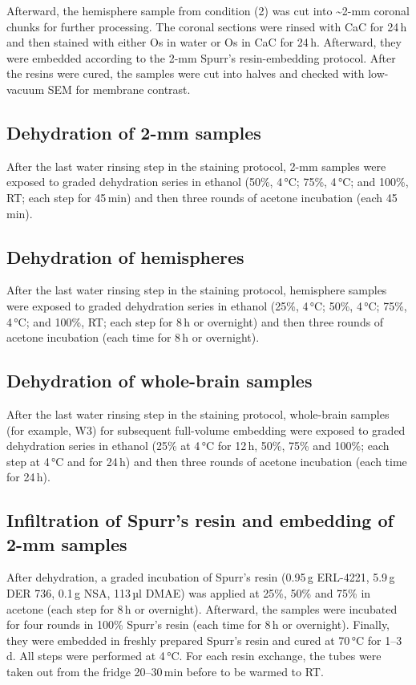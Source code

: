 \documentclass{article}
\begin{document}
Afterward, the hemisphere sample from condition (2) was cut into \textasciitilde{}2-mm coronal chunks for further processing. The coronal sections were rinsed with CaC for 24\,h and then stained with either Os in water or Os in CaC for 24\,h. Afterward, they were embedded according to the 2-mm Spurr’s resin-embedding protocol. After the resins were cured, the samples were cut into halves and checked with low-vacuum SEM for membrane contrast.

\subsection*{Dehydration of 2-mm samples}
After the last water rinsing step in the staining protocol, 2-mm samples were exposed to graded dehydration series in ethanol (50\%, 4\,°C; 75\%, 4\,°C; and 100\%, RT; each step for 45\,min) and then three rounds of acetone incubation (each 45\,min).

\subsection*{Dehydration of hemispheres}
After the last water rinsing step in the staining protocol, hemisphere samples were exposed to graded dehydration series in ethanol (25\%, 4\,°C; 50\%, 4\,°C; 75\%, 4\,°C; and 100\%, RT; each step for 8\,h or overnight) and then three rounds of acetone incubation (each time for 8\,h or overnight).

\subsection*{Dehydration of whole-brain samples}
After the last water rinsing step in the staining protocol, whole-brain samples (for example, W3) for subsequent full-volume embedding were exposed to graded dehydration series in ethanol (25\% at 4\,°C for 12\,h, 50\%, 75\% and 100\%; each step at 4\,°C and for 24\,h) and then three rounds of acetone incubation (each time for 24\,h). 

\subsection*{Infiltration of Spurr’s resin and embedding of 2-mm samples}
After dehydration, a graded incubation of Spurr’s resin (0.95\,g ERL-4221, 5.9\,g DER 736, 0.1\,g NSA, 113\,µl DMAE) was applied at 25\%, 50\% and 75\% in acetone (each step for 8\,h or overnight). Afterward, the samples were incubated for four rounds in 100\% Spurr’s resin (each time for 8\,h or overnight). Finally, they were embedded in freshly prepared Spurr’s resin and cured at 70\,°C for 1–3\,d. All steps were performed at 4\,°C. For each resin exchange, the tubes were taken out from the fridge 20–30\,min before to be warmed to RT.
\end{document}
